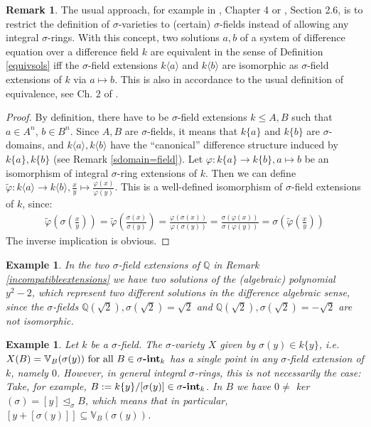 \documentclass{article}
\def\Q{\mathbb{Q}}
\def\VV{\mathbb{V}}
\def\s{\sigma}
\def\si{\unlhd_{\sigma}}
\def\fa{\text{ for all }}
\newcommand{\catname}[1]{{\normalfont\textbf{#1}}}
\newcommand{\sintk}{\s\text{\catname{-int}}_k}
\newenvironment{bew}{\begin{proof}[Proof]}{\end{proof}}
\theoremstyle{plain}
\newtheorem{ex}[Satz]{Example}
\theoremstyle{definition}
\newtheorem{rem}[Satz]{Remark}
\begin{document}
\begin{rem}
The usual approach, for example in \cite{cohn}, Chapter 4 or \cite{levin}, Section 2.6, is to restrict the definition of $\s$-varieties to (certain) $\s$-fields instead of allowing any integral $\s$-rings. With this concept,
two solutions $a,b$ of a system of difference equation over a difference field $k$ are equivalent in the sense of Definition \ref{equivsols} iff the $\s$-field extensions $k\langle a \rangle$ and $k\langle b \rangle$ are isomorphic as $\s$-field extensions of $k$ via $a \mapsto b$.
This is also in accordance to the usual definition of equivalence, see Ch. 2 of \cite{wibmer}. 
\begin{bew}
By definition, there have to be $\s$-field extensions $k \leq A,B$ such that $a \in A^n$, $b \in B^n$. Since $A,B$ are $\s$-fields, it means that $k\{a\}$ and $k\{b\}$ are $\s$-domains, 
and $k\langle a \rangle, k\langle b \rangle$ have the ``canonical'' difference structure induced by $k\{a\}, k\{b\}$ (see Remark \ref{sdomain=field}). Let $\varphi: k\{a\} \rightarrow k\{b\}, a \mapsto b$ be an isomorphism of integral $\s$-ring extensions of $k$.
Then we can define $\tilde \varphi: k \langle a \rangle \rightarrow k\langle b \rangle, \frac{x}{y} \mapsto \frac{\varphi(x)}{\varphi{(y)}}$. This is a well-defined isomorphism of $\s$-field extensions of $k$, since:
\begin{align*}
\tilde \varphi \left(\s \left(\frac{x}{y}\right)\right) = \tilde \varphi \left( \frac{\s \left(x\right)}{\s \left(y\right)}\right) = \frac{ \varphi \left(\s \left(x\right)\right)}{ \varphi \left(\s \left(y\right)\right)} =  \frac{\s \left(\varphi \left(x\right)\right)}{\s \left(\varphi \left(y\right)\right)} = \s \left( \tilde \varphi \left(\frac{x}{y}\right)\right)
\end{align*}
The inverse implication is obvious.
\end{bew}
\end{rem}

\begin{ex}
In the two $\s$-field extensions of $\Q$ in Remark \ref{incompatibleextensions} we have two solutions of the (algebraic) polynomial $y^2-2$, which represent two different solutions in the difference algebraic sense,
since the $\s$-fields $\Q(\sqrt{2}), \s(\sqrt{2}) = \sqrt{2}$ and $\Q(\sqrt{2}), \s(\sqrt{2}) = -\sqrt{2}$ are not isomorphic. 
\end{ex}

\begin{ex}
Let $k$ be a $\s$-field. The $\s$-variety $X$ given by $\s(y) \in k\{y\}$, i.e. $X(B) = \VV_B(\s(y)) \fa B \in \sintk$ has a single point in any $\s$-field extension of $k$, namely $0$. However, in general integral $\s$-rings,
this is not necessarily the case: Take, for example, $B:= k\{y\}/[\s(y)] \in \sintk$. In $B$ we have $0 \neq $ ker$(\s) = [y] \si B$, which means that in particular, $[y + [\s(y)]] \subseteq \VV_B(\s(y))$.
\end{ex}
\end{document}
